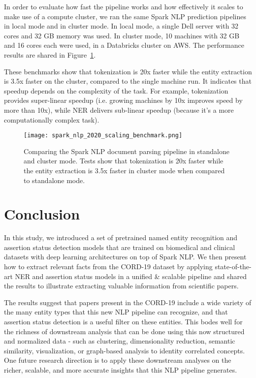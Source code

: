 \documentclass[letterpaper]{article} \usepackage{aaai21}  \usepackage{times}  \usepackage{helvet} \usepackage{courier}  \usepackage[hyphens]{url}  \usepackage{graphicx} \urlstyle{rm} \def\UrlFont{\rm}  \usepackage{natbib}  \usepackage{caption} \frenchspacing  \setlength{\pdfpagewidth}{8.5in}  \setlength{\pdfpageheight}{11in}  \usepackage{lscape}
\begin{document}
In order to evaluate how fast the pipeline works and how effectively it scales to make use of a compute cluster, we ran the same Spark NLP prediction pipelines in local mode and in cluster mode. In local mode, a single Dell server with 32 cores and 32 GB memory was used. In cluster mode, 10 machines with 32 GB and 16 cores each were used, in a Databricks cluster on AWS. The performance results are shared in Figure~\ref{fig:scale_bars}. 

These benchmarks show that tokenization is 20x faster while the entity extraction is 3.5x faster on the cluster, compared to the single machine run. It indicates that speedup depends on the complexity of the task. For example, tokenization provides super-linear speedup (i.e. growing machines by 10x improves speed by more than 10x), while NER delivers sub-linear speedup (because it's a more computationally complex task).

\begin{figure}[ht!]
\texttt{[image: spark\_nlp\_2020\_scaling\_benchmark.png]}
\centering
\caption{Comparing the Spark NLP document parsing pipeline in standalone and cluster mode. Tests show that tokenization is 20x faster while the entity extraction is 3.5x faster in cluster mode when compared to standalone mode.}
\label{fig:scale_bars}
\end{figure}

\section{Conclusion}
\label{sec:conclusion}

In this study, we introduced a set of pretrained named entity recognition and assertion status detection models that are trained on biomedical and clinical datasets with deep learning architectures on top of Spark NLP. We then present how to extract relevant facts from the CORD-19 dataset by applying state-of-the-art NER and assertion status models in a unified \& scalable pipeline and shared the results to illustrate extracting valuable information from scientific papers.

The results suggest that papers present in the CORD-19 include a wide variety of the many entity types that this new NLP pipeline can recognize, and that assertion status detection is a useful filter on these entities. This bodes well for the richness of downstream analysis that can be done using this now structured and normalized data - such as clustering, dimensionality reduction, semantic similarity, visualization, or graph-based analysis to identity correlated concepts. One future research direction is to apply these downstream analyses on the richer, scalable, and more accurate insights that this NLP pipeline generates.
\end{document}
